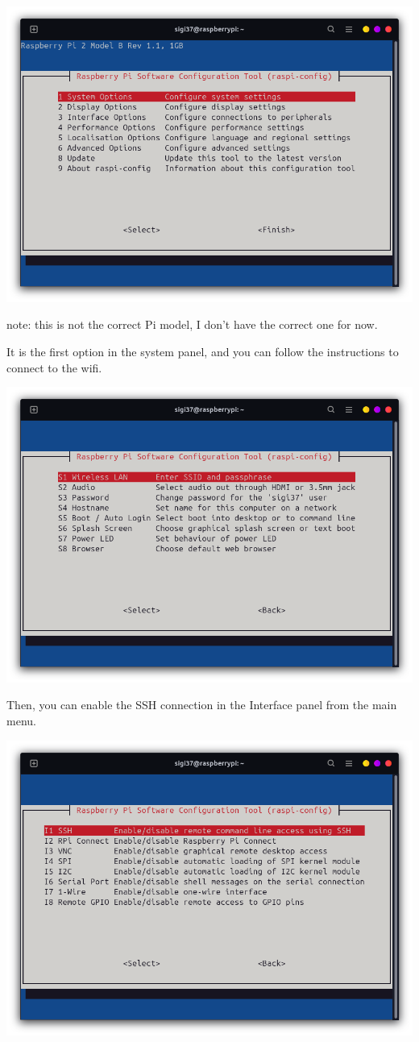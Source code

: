 \documentclass{article}
\begin{document}
\includegraphics[scale=0.37]{img/raspi_config_home.png}

note: this is not the correct Pi model, I don't have the correct one for now.

It is the first option in the system panel, and you can follow the instructions to connect to the
wifi.

\includegraphics[scale=0.37]{img/raspi_config_wifi.png}

Then, you can enable the SSH connection in the Interface panel from the main menu.

\includegraphics[scale=0.37]{img/raspi_config_ssh.png}
\end{document}
